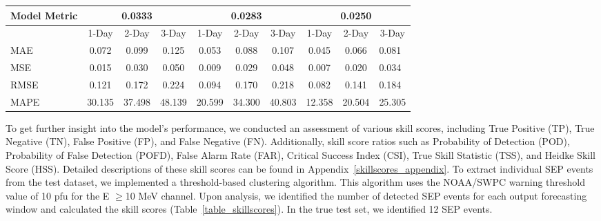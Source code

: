 \begin{table}[htp]
\begin{tabular}{lccccccccl}
Model Metric & \multicolumn{3}{c}{0.0333}                      & \multicolumn{3}{c}{0.0283}                      & \multicolumn{3}{c}{0.0250}                      \\ \hline
       & 1-Day          & 2-Day          & 3-Day         & 1-Day          & 2-Day          & 3-Day         & 1-Day    & 2-Day   & \multicolumn{1}{c}{3-Day}  \\ \hline
MAE    & 0.072          & 0.099          & 0.125         & 0.053          & 0.088          & 0.107         & 0.045    & 0.066   & 0.081                      \\
MSE    & 0.015          & 0.030          & 0.050         & 0.009          & 0.029          & 0.048         & 0.007    & 0.020   & 0.034                      \\
RMSE   & 0.121          & 0.172          & 0.224         & 0.094          & 0.170          & 0.218         & 0.082    & 0.141   & 0.184                      \\
MAPE   & 30.135         & 37.498         & 48.139        & 20.599         & 34.300         & 40.803        & 12.358   & 20.504  & 25.305                     \\ \hline
\end{tabular}
\label{table_performance}
\end{table}

To get further insight into the model's performance, we conducted an assessment of various skill scores, including True Positive (TP), True Negative (TN), False Positive (FP), and False Negative (FN). Additionally, skill score ratios such as Probability of Detection (POD), Probability of False Detection (POFD), False Alarm Rate (FAR), Critical Success Index (CSI), True Skill Statistic (TSS), and Heidke Skill Score (HSS). Detailed descriptions of these skill scores can be found in Appendix~\ref{skillscores_appendix}.
To extract individual SEP events from the test dataset, we implemented a threshold-based clustering algorithm. This algorithm uses the NOAA/SWPC warning threshold value of 10 pfu for the E $\geq$10 MeV channel. Upon analysis, we identified the number of detected SEP events for each output forecasting window and calculated the skill scores (Table~\ref{table_skillscores}). In the true test set, we identified 12 SEP events.

